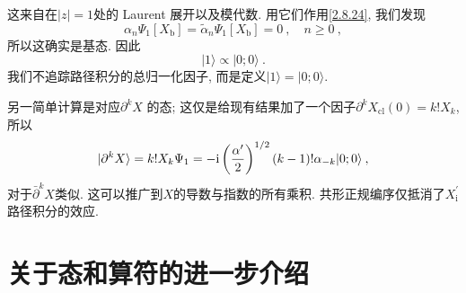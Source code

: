 这来自在$|z|=1$处的 Laurent 展开以及模代数. 用它们作用\eqref{2.8.24}, 我们发现
\begin{equation}
\alpha_{n} \Psi_{1} [X_{\mathrm{b}}]=\tilde{\alpha}_{n} \Psi_{1}[X_{\mathrm{b}}]=0\:, \quad n \geq 0 \:, \label{2.8.26}
\end{equation}
所以这确实是基态. 因此
\begin{equation}
|1\rangle \propto|0 ; 0\rangle \:. \label{2.8.27}
\end{equation}
我们不追踪路径积分的总归一化因子, 而是定义$|1\rangle =|0 ; 0\rangle$.

另一简单计算是对应$\partial^{k} X$ 的态; 这仅是给现有结果加了一个因子$\partial^{k} X_{\mathrm{cl}}(0)=k ! X_{k}$, 所以
\begin{equation}
\lvert \partial^{k} X \rangle=k ! X_{k} \Psi_{1}=-\mathrm{i}\left(\frac{\alpha^{\prime}}{2}\right)^{1 / 2}(k-1) ! \alpha_{-k}|0 ; 0\rangle \:, \label{2.8.28}
\end{equation}
对于$\bar{\partial}^{k} X$类似. 这可以推广到$X$的导数与指数的所有乘积. 共形正规编序仅抵消了$X_\mathrm{i}^\prime$ 路径积分的效应.

\section{\texorpdfstring{关于态和算符的进一步介绍}{2.9 More on states and operators}} \label{sec:2.9}

